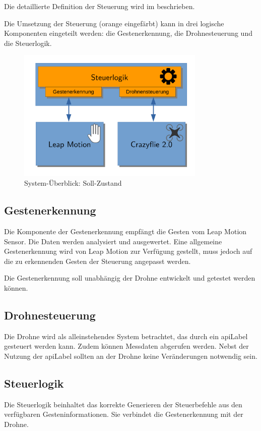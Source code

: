 Die detaillierte Definition der Steuerung wird im  beschrieben.

Die Umsetzung der Steuerung (orange eingefärbt) kann in drei logische Komponenten eingeteilt werden: die Gestenerkennung, die Drohnesteuerung und die Steuerlogik.

\begin{figure}[H]
	\centering
	\includegraphics[width=0.8\textwidth]{figures/system_full.pdf}
	\caption{System-Überblick: Soll-Zustand}
\end{figure}

\subsection{Gestenerkennung}
Die Komponente der Gestenerkennung empfängt die Gesten vom Leap Motion Sensor. Die Daten werden analysiert und ausgewertet.
Eine allgemeine Gestenerkennung wird von Leap Motion zur Verfügung gestellt, muss jedoch auf die zu erkennenden Gesten der Steuerung angepasst werden.

Die Gestenerkennung soll unabhängig der Drohne entwickelt und getestet werden können.

\subsection{Drohnesteuerung}
Die Drohne wird als alleinstehendes System betrachtet, das durch ein \gls{apiLabel} gesteuert werden kann. Zudem können Messdaten abgerufen werden. Nebst der Nutzung der \gls{apiLabel} sollten an der Drohne keine Veränderungen notwendig sein.

\subsection{Steuerlogik}
Die Steuerlogik beinhaltet das korrekte Generieren der Steuerbefehle aus den verfügbaren Gesteninformationen.
Sie verbindet die Gestenerkennung mit der Drohne.

